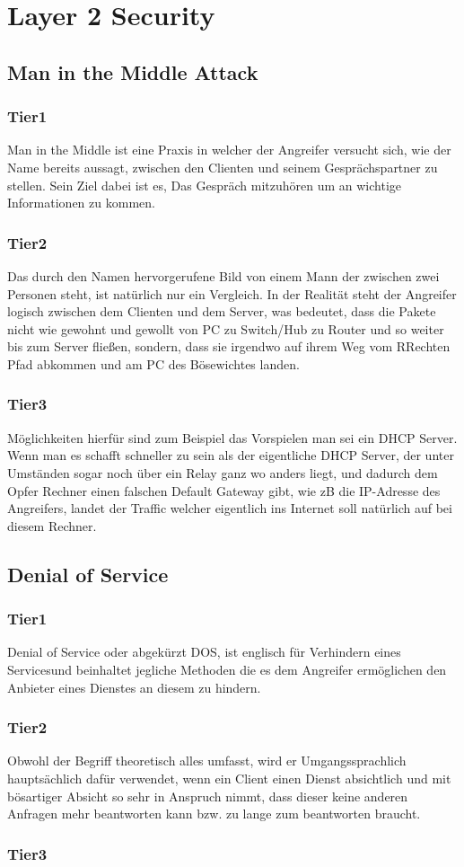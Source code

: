 \chapter{Layer 2 Security}
\section{Man in the Middle Attack}
\subsection{Tier1}
Man in the Middle ist eine Praxis in welcher der Angreifer versucht sich, wie der Name bereits aussagt, zwischen den Clienten und seinem Gesprächspartner zu stellen. Sein Ziel dabei ist es, Das Gespräch mitzuhören um an wichtige Informationen zu kommen.
\subsection{Tier2}
Das durch den Namen hervorgerufene Bild von einem Mann der zwischen zwei Personen steht, ist natürlich nur ein Vergleich. In der Realität steht der Angreifer logisch zwischen dem Clienten und dem Server, was bedeutet, dass die Pakete nicht wie gewohnt und gewollt von PC zu Switch/Hub zu Router und so weiter bis zum Server fließen, sondern, dass sie irgendwo auf ihrem Weg vom RRechten Pfad abkommen und am PC des Bösewichtes landen.
\subsection{Tier3}
Möglichkeiten hierfür sind zum Beispiel das Vorspielen man sei ein DHCP Server. Wenn man es schafft schneller zu sein als der eigentliche DHCP Server, der unter Umständen sogar noch über ein Relay ganz wo anders liegt, und dadurch dem Opfer Rechner einen falschen Default Gateway gibt, wie zB die IP-Adresse des Angreifers, landet der Traffic welcher eigentlich ins Internet soll natürlich auf bei diesem Rechner. 

\section{Denial of Service}
\subsection{Tier1}
Denial of Service oder abgekürzt DOS, ist englisch für \glqq Verhindern eines Services\grqq und beinhaltet jegliche Methoden die es dem Angreifer ermöglichen den Anbieter eines Dienstes an diesem zu hindern.
\subsection{Tier2}
Obwohl der Begriff theoretisch alles umfasst, wird er Umgangssprachlich hauptsächlich dafür verwendet, wenn ein Client einen Dienst absichtlich und mit bösartiger Absicht so sehr in Anspruch nimmt, dass dieser keine anderen Anfragen mehr beantworten kann bzw. zu lange zum beantworten braucht. 
\subsection{Tier3}